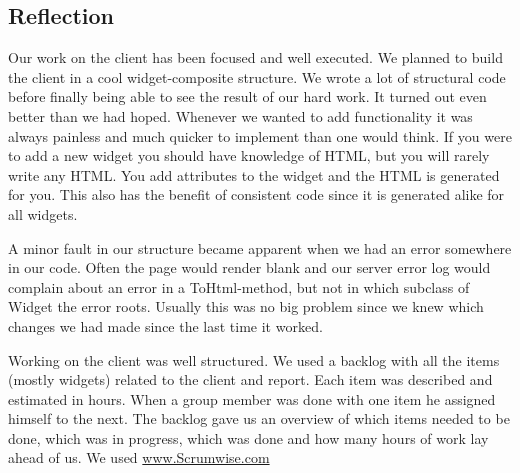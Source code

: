 \subsection{Reflection}
Our work on the client has been focused and well executed. We planned to build the client in a cool widget-composite structure. We wrote a lot of structural code before finally being able to see the result of our hard work. It turned out even better than we had hoped. Whenever we wanted to add functionality it was always painless and much quicker to implement than one would think. If you were to add a new widget you should have knowledge of HTML, but you will rarely write any HTML. You add attributes to the widget and the HTML is generated for you. This also has the benefit of consistent code since it is generated alike for all widgets.

A minor fault in our structure became apparent when we had an error somewhere in our code. Often the page would render blank and our server error log would complain about an error in a ToHtml-method, but not in which subclass of Widget the error roots. Usually this was no big problem since we knew which changes we had made since the last time it worked.

Working on the client was well structured. We used a backlog with all the items (mostly widgets) related to the client and report. Each item was described and estimated in hours. When a group member was done with one item he assigned himself to the next. The backlog gave us an overview of which items needed to be done, which was in progress, which was done and how many hours of work lay ahead of us. We used \url{www.Scrumwise.com}
\newpage